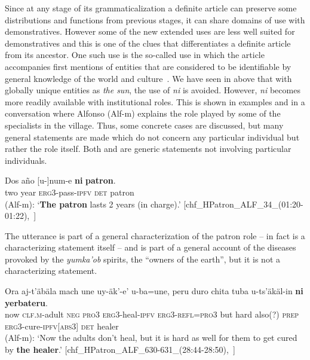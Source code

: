 \documentclass[output=paper
,modfonts
,nonflat]{langsci/langscibook}
\begin{document}
Since at any stage of its grammaticalization a definite article can preserve some distributions and functions from previous stages, it can share domains of use with demonstratives. However some of the new extended uses are less well suited for demonstratives and this is one of the clues that differentiates a definite article from its ancestor. 
One such use is the so-called  use in which the article accompanies first mentions of entities that are considered to be identifiable by general knowledge of the world and culture~\citep[][]{Himmelmann2001}. We have seen in  above that with globally unique entities as \textit{the sun}, the use of \textit{ni} is avoided. However, \textit{ni} becomes more readily available with institutional roles. This is shown in examples  and  in a conversation where Alfonso (Alf-m) explains the role played by some of the specialists in the village. Thus, some concrete cases are discussed, but many general statements are made which do not concern any particular individual but rather the role itself. Both  and  are generic statements not involving particular individuals. 

\ea \label{ex:pico:50}

\gll Dos a\~no [u-]num-e \textbf{ni} \textbf{patron}.\\
{two} {year} \textsc{erg3}-{pass}-\textsc{ipfv} \textsc{det} {patron}\\
\glt (Alf-m): `\textbf{The patron} lasts 2 years (in charge).' [chf\_HPatron\_ALF\_34\_(01:20-01:22),~\citealt{Delgado-Galvan2018archive}]
\z


The utterance  is part of a general characterization of the patron role -- in fact  is a characterizing statement itself -- and  is part of a general account of the diseases provoked by the \textit{yumka'ob} spirits, the ``owners of the earth'', but it is not a characterizing statement.

\ea \label{ex:pico:51}

\gll Ora aj-t'äbäla mach une uy-äk'-e' u-ba=une, peru duro chita tuba u-ts'äkäl-in \textbf{ni} \textbf{yerbateru}.\\
now \textsc{clf.m}-adult \textsc{neg} \textsc{pro3} \textsc{erg3}-{heal}-\textsc{ipfv} \textsc{erg3}-\textsc{refl}=\textsc{pro3} but {hard} also(?) \textsc{prep} \textsc{erg3}-{cure}-\textsc{ipfv[abs3]} \textsc{det} healer\\
\glt (Alf-m): `Now the adults don't heal, but it is hard as well for them to get cured by \textbf{the healer}.' [chf\_HPatron\_ALF\_630-631\_(28:44-28:50),~\citealt{Delgado-Galvan2018archive}]
\z
\end{document}

